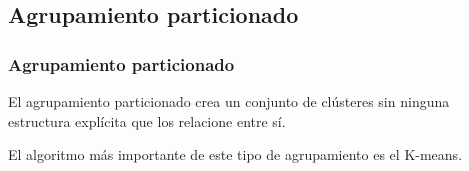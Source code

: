 \documentclass[t,compress,10pt,xcolor=dvipsnames]{beamer}
\begin{document}
%		
%			
%		
%	
	
%			
%			
%			

	\subsection{Agrupamiento particionado}
	\frame
	{
		\frametitle{Agrupamiento particionado}
		\vspace{7em}
		El agrupamiento particionado crea un conjunto  de clústeres sin ninguna estructura explícita que los relacione entre sí. 
		
		El algoritmo m\'as importante de este tipo de agrupamiento es el K-means.
	}
	
\end{document}

